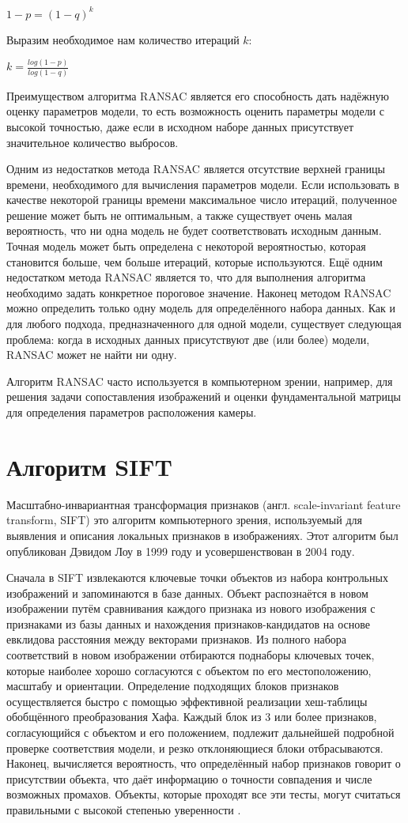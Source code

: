 $1-p=(1-q)^k$

Выразим необходимое нам количество итераций $k$:

$\displaystyle k = \frac{log(1-p)}{log(1-q)}$

Преимуществом алгоритма RANSAC является его способность дать надёжную оценку параметров модели, то есть возможность оценить параметры модели с высокой точностью, даже если в исходном наборе данных присутствует значительное количество выбросов. 

Одним из недостатков метода RANSAC является отсутствие верхней границы времени, необходимого для вычисления параметров модели. Если использовать в качестве некоторой границы времени максимальное число итераций, полученное решение может быть не оптимальным, а также существует очень малая вероятность, что ни одна модель не будет соответствовать исходным данным. Точная модель может быть определена с некоторой вероятностью, которая становится больше, чем больше итераций, которые используются. Ещё одним недостатком метода RANSAC является то, что для выполнения алгоритма необходимо задать конкретное пороговое значение. Наконец методом RANSAC можно определить только одну модель для определённого набора данных. Как и для любого подхода, предназначенного для одной модели, существует следующая проблема: когда в исходных данных присутствуют две (или более) модели, RANSAC может не найти ни одну.

Алгоритм RANSAC часто используется в компьютерном зрении, например, для решения задачи сопоставления изображений и оценки фундаментальной матрицы для определения параметров расположения камеры.

\section{Алгоритм SIFT}
Масштабно-инвариантная трансформация признаков (англ. scale-invariant feature transform, SIFT) это алгоритм компьютерного зрения, используемый для выявления и описания локальных признаков в изображениях. Этот алгоритм был опубликован Дэвидом Лоу в 1999 году и усовершенствован в 2004 году.

Сначала в SIFT извлекаются ключевые точки объектов из набора контрольных изображений \cite{Sift} и запоминаются в базе данных. Объект распознаётся в новом изображении путём сравнивания каждого признака из нового изображения с признаками из базы данных и нахождения признаков-кандидатов на основе евклидова расстояния между векторами признаков. Из полного набора соответствий в новом изображении отбираются поднаборы ключевых точек, которые наиболее хорошо согласуются с объектом по его местоположению, масштабу и ориентации. Определение подходящих блоков признаков осуществляется быстро с помощью эффективной реализации хеш-таблицы обобщённого преобразования Хафа. Каждый блок из 3 или более признаков, согласующийся с объектом и его положением, подлежит дальнейшей подробной проверке соответствия модели, и резко отклоняющиеся блоки отбрасываются. Наконец, вычисляется вероятность, что определённый набор признаков говорит о присутствии объекта, что даёт информацию о точности совпадения и числе возможных промахов. Объекты, которые проходят все эти тесты, могут считаться правильными с высокой степенью уверенности \cite{Sift2}. 

